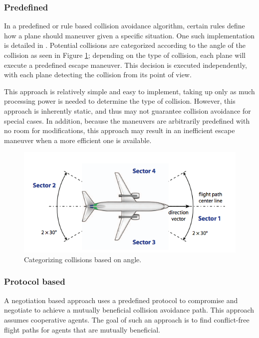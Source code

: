 \documentclass[conference]{IEEEtran}
\begin{document}
\subsubsection{Predefined}
In a predefined or rule based collision avoidance algorithm, certain rules define how a plane should maneuver given a specific situation.
One such implementation is detailed in \cite{sislak2006negotiation}. Potential collisions are categorized according to the angle of the collision as seen in Figure \ref{fig:06SislakID}; depending on the type of collision, each plane will execute a predefined escape maneuver. This decision is executed independently, with each plane detecting the collision from its point of view.  

This approach is relatively simple and easy to implement, taking up only as much processing power is needed to determine the type of collision. However, this approach is inherently static, and thus may not guarantee collision avoidance for special cases. In addition, because the maneuvers are arbitrarily predefined with no room for modifications, this approach may result in an inefficient escape maneuver when a more efficient one is available. 
\begin{figure}[h]
	\includegraphics [width=1\columnwidth] {06SislakCollisionId}
	\caption{Categorizing collisions based on angle. \cite{sislak2006negotiation}}
	\label{fig:06SislakID}
\end{figure}
\subsubsection{Protocol based}

A negotiation based approach uses a predefined protocol to compromise and negotiate to achieve a mutually beneficial collision avoidance path. This approach assumes cooperative agents. The goal of such an approach is to find conflict-free flight paths for agents that are mutually beneficial.
\end{document}
